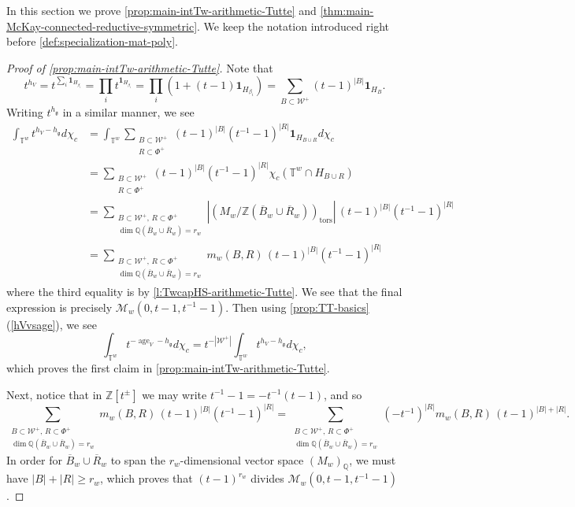 \documentclass[12pt,a4paper]{amsart}
\theoremstyle{definition}
\newcommand{\TT}{\mathbb T}
\newcommand{\ZZ}{\mathbb{Z}}
\newcommand{\QQ}{\mathbb{Q}}
\newcommand{\cW}{\mathcal{W}}
\newcommand{\cM}{\mathcal{M}}
\newcommand{\g}{\mathfrak{g}}
\renewcommand{\1}{\textbf{1}}
\newcommand{\<}{\langle}
\renewcommand{\>}{\rangle}
\DeclareMathOperator{\age}{age}
\DeclareMathOperator{\tors}{tors}
\begin{document}
In this section we prove \autoref{prop:main-intTw-arithmetic-Tutte} and \autoref{thm:main-McKay-connected-reductive-symmetric}. We keep the notation introduced right before \autoref{def:specialization-mat-poly}.



\begin{proof}[{Proof of \autoref{prop:main-intTw-arithmetic-Tutte}}]
Note that
\[
	t^{h_V}=t^{\sum_i \1_{H_{\beta_i}}} =\prod_i t^{\1_{H_{\beta_i}}}=\prod_i (1+(t-1)\1_{H_{\beta_i}})=\sum_{B\subset\cW^+}(t-1)^{|B|}\1_{H_B}.
\]
Writing $t^{h_\g}$ in a similar manner, we see
\begin{align*}
	\int_{\TT^w}t^{h_V-h_\g}d\chi_c &=\int_{\TT^w}\sum_{\substack{B\subset\cW^+\\ R\subset\Phi^+}}(t-1)^{|B|}(t^{-1}-1)^{|R|}\1_{H_{B\cup R}}d\chi_c\\
	&=\sum_{\substack{B\subset\cW^+\\ R\subset\Phi^+}}(t-1)^{|B|}(t^{-1}-1)^{|R|}\chi_c(\TT^w\cap H_{B\cup R})\\
	&=\sum_{\substack{B\subset\cW^+,\, R\subset\Phi^+\\ \dim\QQ(\overline{B}_w\cup \overline{R}_w)=r_w}}|( M_w/\ZZ(\overline{B}_w\cup\overline{R}_w))_{\tors}|\,(t-1)^{|B|}(t^{-1}-1)^{|R|}\\
	&=\sum_{\substack{B\subset\cW^+,\, R\subset\Phi^+\\ \dim\QQ(\overline{B}_w\cup \overline{R}_w)=r_w}}m_w(B,R)\,(t-1)^{|B|}(t^{-1}-1)^{|R|}
\end{align*}
where the third equality is by \autoref{l:TwcapHS-arithmetic-Tutte}. We see that the final expression is precisely $\cM_w(0,t-1,t^{-1}-1)$. Then using \autoref{prop:TT-basics}(\ref{hVvsage}), we see
\[
	\int_{\TT^w}t^{-\age_V-h_\g}d\chi_c=t^{-|\cW^+|}\int_{\TT^w}t^{h_V-h_\g}d\chi_c,
\]
which proves the first claim in \autoref{prop:main-intTw-arithmetic-Tutte}.

Next, notice that in $\ZZ[t^\pm]$ we may write $t^{-1}-1=-t^{-1}(t-1)$, and so
\begin{equation}\label{eqn:Mw-alternative-expression}
	\sum_{\substack{B\subset\cW^+,\, R\subset\Phi^+\\ \dim\QQ(\overline{B}_w\cup \overline{R}_w)=r_w}}m_w(B,R)\,(t-1)^{|B|}(t^{-1}-1)^{|R|}=\sum_{\substack{B\subset\cW^+,\, R\subset\Phi^+\\ \dim\QQ(\overline{B}_w\cup \overline{R}_w)=r_w}}(-t^{-1})^{|R|}m_w(B,R)\,(t-1)^{|B|+|R|}.
\end{equation}
In order for $\overline{B}_w\cup \overline{R}_w$ to span the $r_w$-dimensional vector space $( M_w)_\QQ$, we must have $|B|+|R|\geq r_w$, which proves that $(t-1)^{r_w}$ divides $\cM_w(0,t-1,t^{-1}-1)$.
\end{proof}
\end{document}
